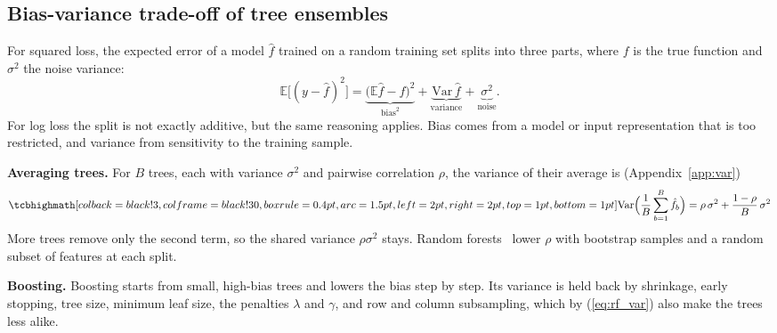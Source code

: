 \subsection{Bias-variance trade-off of tree ensembles}
\label{sec:theory_bv}

For squared loss, the expected error of a model $\hat{f}$ trained on a random training set splits into
three parts, where $f$ is the true function and $\sigma^2$ the noise variance:
\begin{equation}
\mathbb{E}\big[(y - \hat{f})^2\big] =
\underbrace{\big(\mathbb{E}\hat{f} - f\big)^2}_{\text{bias}^2}
+ \underbrace{\mathrm{Var}\,\hat{f}}_{\text{variance}}
+ \underbrace{\sigma^2}_{\text{noise}} .
\label{eq:biasvar}
\end{equation}
For log loss the split is not exactly additive, but the same reasoning applies. Bias comes from a model or
input representation that is too restricted, and variance from sensitivity to the training sample.

\textbf{Averaging trees.} For $B$ trees, each with variance $\sigma^2$ and pairwise correlation $\rho$, the
variance of their average is (Appendix~\ref{app:var})
\begin{equation}
\keyeq{\mathrm{Var}\Big(\frac{1}{B}\sum_{b=1}^{B} \hat{f}_b\Big) = \rho\,\sigma^2 + \frac{1-\rho}{B}\,\sigma^2}
\label{eq:rf_var}
\end{equation}
More trees remove only the second term, so the shared variance $\rho\sigma^2$ stays. Random
forests~\cite{breiman2001} lower $\rho$ with bootstrap samples and a random subset of features at each
split.

\textbf{Boosting.} Boosting starts from small, high-bias trees and lowers the bias step by step. Its
variance is held back by shrinkage, early stopping, tree size, minimum leaf size, the penalties $\lambda$
and $\gamma$, and row and column subsampling, which by (\ref{eq:rf_var}) also make the trees less alike.

